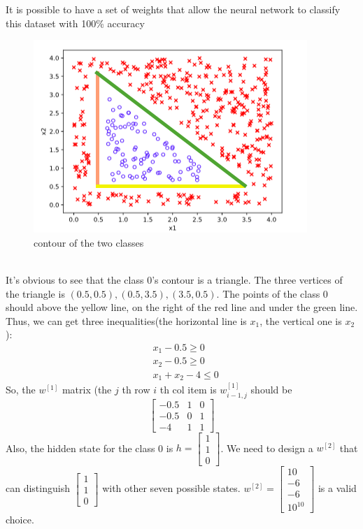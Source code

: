 \begin{answer}
It is possible to have a set of weights that allow the neural network to classify this dataset with 100\% accuracy
\begin{figure}[htbp] 
	\centering
	\includegraphics[scale=0.7]{tex/01-simple_nn/1(b)step_function.png}
	\caption{contour of the two classes}
\end{figure}\\
It's obvious to see that the class 0's contour is a triangle. The three  vertices of the triangle is $(0.5, 0.5), (0.5, 3.5), (3.5, 0.5)$. The points of the class 0 should above the yellow line, on the right of the red line and under the green line. Thus, we can get three inequalities(the horizontal line is $x_1$, the vertical one is $x_2$):
\begin{align*}
    &x_1 - 0.5 \geq 0\\
    &x_2 - 0.5 \geq 0\\
    &x_1 + x_2 - 4 \leq 0
\end{align*}
So, the $w^{[1]}$ matrix (the $j$ th row $i$ th col item is $w^{[1]}_{i - 1, j}$ should be $$\begin{bmatrix}-0.5 & 1 & 0\\ -0.5 &  0 & 1\\
-4 & 1 & 1\end{bmatrix}$$
Also, the hidden state for the class 0 is $h = \begin{bmatrix}  1\\ 1\\ 0\end{bmatrix}$. We need to design a $w^{[2]}$ that can distinguish $\begin{bmatrix}1 \\ 1 \\ 0\end{bmatrix}$ with other seven possible states. $w^{[2]} = \begin{bmatrix}10 \\ -6 \\ -6 \\ 10^{10}\end{bmatrix}$ is a valid choice.
\end{answer}
